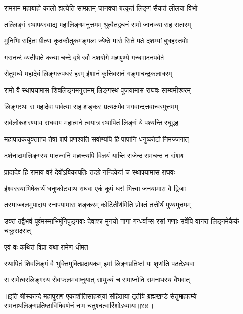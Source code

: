 \twolineshloka
{रामराम महाबाहो कालो ह्यत्येति साम्प्रतम्}
{जानक्या यत्कृतं लिङ्गं सैकतं लीलया विभो}%

\twolineshloka
{तल्लिङ्गं स्थापयस्वाद्य महालिङ्गमनुत्तमम्}
{श्रुत्वैतद्वचनं रामो जानक्या सह सत्वरम्}%

\twolineshloka
{मुनिभिः सहितः प्रीत्या कृतकौतुकमङ्गलः}
{ज्येष्ठे मासे सिते पक्षे दशम्यां बुधहस्तयोः}%

\twolineshloka
{गरानन्दे व्यतीपाते कन्या चन्द्रे वृषे रवौ}
{दशयोगे महापुण्ये गन्धमादनपर्वते}%

\twolineshloka
{सेतुमध्ये महादेवं लिङ्गरूपधरं हरम्}
{ईशानं कृत्तिवसनं गङ्गाचन्द्रकलाधरम्}%

\twolineshloka
{रामो वै स्थापयामास शिवलिङ्गमनुत्तमम्}
{लिङ्गस्थं पूजयामास राघवः साम्बमीश्वरम्}%

\twolineshloka
{लिङ्गस्थः स महादेवः पार्वत्या सह शङ्करः}
{प्रत्यक्षमेव भगवान्दत्तवान्वरमुत्तमम्}%

\twolineshloka
{सर्वलोकशरण्याय राघवाय महात्मने}
{त्वयात्र स्थापितं लिङ्गं ये पश्यन्ति रघूद्वह}%

\twolineshloka
{महापातकयुक्ताश्च तेषां पापं प्रणश्यति}
{सर्वाण्यपि हि पापानि धनुष्कोटौ निमज्जनात्}%

\twolineshloka
{दर्शनाद्रामलिङ्गस्य पातकानि महान्त्यपि}
{विलयं यान्ति राजेन्द्र रामचन्द्र न संशयः}%

\twolineshloka
{प्रादादेवं हि रामाय वरं देवोंऽबिकापतिः}
{तदग्रे नन्दिकेशं च स्थापयामास राघवः}%

\twolineshloka
{ईश्वरस्याभिषेकार्थं धनुष्कोट्याथ राघवः}
{एकं कूपं धरां भित्त्वा जनयामास वै द्विजाः}%

\twolineshloka
{तस्माज्जलमुपादाय स्नापयामास शङ्करम्}
{कोटितीर्थमिति प्रोक्तं तत्तीर्थं पुण्यमुत्तमम्}%

\threelineshloka
{उक्तं तद्वैभवं पूर्वमस्माभिर्मुनिपुङ्गवाः}
{देवाश्च मुनयो नागा गन्धर्वाप्स रसां गणाः}
{सर्वेपि वानरा लिङ्गमेकैकं चक्रुरादरात्}%



\onelineshloka
{एवं वः कथितं विप्रा यथा रामेण धीमत}%

\twolineshloka
{स्थापितं शिवलिङ्गं वै भुक्तिमुक्तिप्रदायकम्}
{इमां लिङ्गप्रतिष्ठां यः शृणोति पठतेऽथवा}%

\twolineshloka
{स रामेश्वरलिङ्गस्य सेवाफलमवाप्नुयात्}
{सायुज्यं च समाप्नोति रामनाथस्य वैभवात्}%

॥इति श्रीस्कान्दे महापुराण एकाशीतिसाहस्र्यां संहितायां तृतीये ब्रह्मखण्डे सेतुमाहात्म्ये रामनाथलिङ्गप्रतिष्ठाविधिवर्णनं नाम चतुश्चत्वारिंशोऽध्यायः॥४४॥

